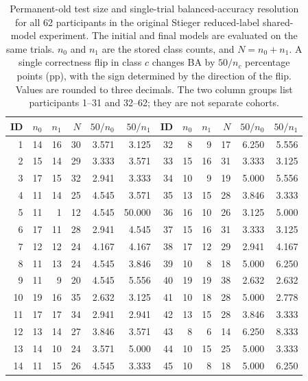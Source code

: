 \begin{table}[htbp]
\centering
\small
\setlength{\tabcolsep}{3pt}
\caption{Permanent-old test size and single-trial balanced-accuracy resolution for all 62 participants in the original Stieger reduced-label shared-model experiment. The initial and final models are evaluated on the same trials. $n_0$ and $n_1$ are the stored class counts, and $N=n_0+n_1$. A single correctness flip in class $c$ changes BA by $50/n_c$ percentage points (pp), with the sign determined by the direction of the flip. Values are rounded to three decimals. The two column groups list participants 1--31 and 32--62; they are not separate cohorts.}
\label{tab:old-test-resolution}
\begin{tabular}{@{}rrrrrr@{\hspace{9pt}}rrrrrr@{}}
\toprule
ID & $n_0$ & $n_1$ & $N$ & $50/n_0$ & $50/n_1$ & ID & $n_0$ & $n_1$ & $N$ & $50/n_0$ & $50/n_1$\\
\midrule
1 & 14 & 16 & 30 & 3.571 & 3.125 & 32 & 8 & 9 & 17 & 6.250 & 5.556\\
2 & 15 & 14 & 29 & 3.333 & 3.571 & 33 & 15 & 16 & 31 & 3.333 & 3.125\\
3 & 17 & 15 & 32 & 2.941 & 3.333 & 34 & 10 & 9 & 19 & 5.000 & 5.556\\
4 & 11 & 14 & 25 & 4.545 & 3.571 & 35 & 13 & 15 & 28 & 3.846 & 3.333\\
5 & 11 & 1 & 12 & 4.545 & 50.000 & 36 & 16 & 10 & 26 & 3.125 & 5.000\\
6 & 17 & 11 & 28 & 2.941 & 4.545 & 37 & 15 & 16 & 31 & 3.333 & 3.125\\
7 & 12 & 12 & 24 & 4.167 & 4.167 & 38 & 17 & 12 & 29 & 2.941 & 4.167\\
8 & 11 & 13 & 24 & 4.545 & 3.846 & 39 & 10 & 8 & 18 & 5.000 & 6.250\\
9 & 11 & 9 & 20 & 4.545 & 5.556 & 40 & 19 & 19 & 38 & 2.632 & 2.632\\
10 & 19 & 16 & 35 & 2.632 & 3.125 & 41 & 10 & 18 & 28 & 5.000 & 2.778\\
11 & 17 & 17 & 34 & 2.941 & 2.941 & 42 & 13 & 15 & 28 & 3.846 & 3.333\\
12 & 13 & 14 & 27 & 3.846 & 3.571 & 43 & 8 & 6 & 14 & 6.250 & 8.333\\
13 & 14 & 10 & 24 & 3.571 & 5.000 & 44 & 10 & 15 & 25 & 5.000 & 3.333\\
14 & 11 & 15 & 26 & 4.545 & 3.333 & 45 & 10 & 8 & 18 & 5.000 & 6.250\\

\end{tabular}
\end{table}
